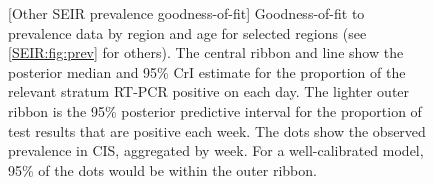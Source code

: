 \documentclass[thesis.tex]{subfiles}
\begin{document}
\begin{figure}
    \captionsetup{width=0.8\paperwidth}
    [Other SEIR prevalence goodness-of-fit]{%
        Goodness-of-fit to prevalence data by region and age for selected regions (see \cref{SEIR:fig:prev} for others).
        The central ribbon and line show the posterior median and 95\% CrI estimate for the proportion of the relevant stratum RT-PCR positive on each day.
        The lighter outer ribbon is the 95\% posterior predictive interval for the proportion of test results that are positive each week.
        The dots show the observed prevalence in CIS, aggregated by week.
        For a well-calibrated model, 95\% of the dots would be within the outer ribbon.
    }
    \label{SEIR:fig:prev-appendix}
\end{figure}
\end{document}
